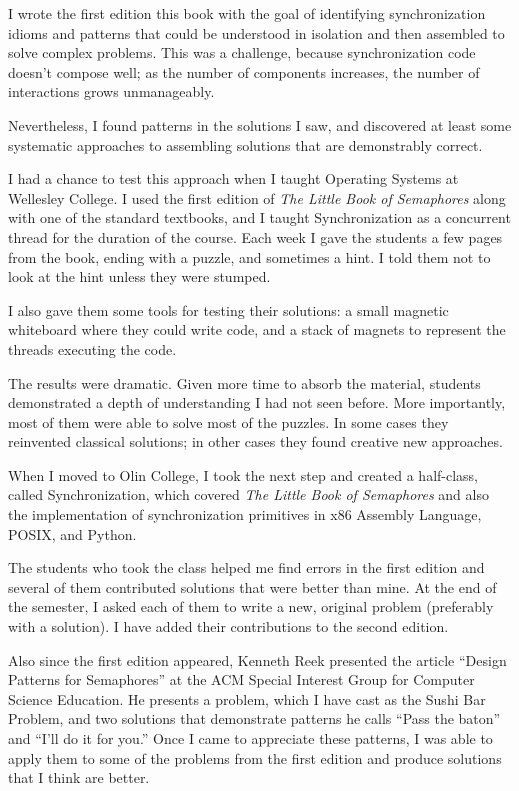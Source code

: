 \documentclass{book}
\begin{document}
I wrote the first edition this book with the goal of identifying
synchronization idioms and patterns that could be 
understood in isolation and then assembled to solve complex problems.
This was a challenge, because synchronization code doesn't compose
well; as the number of components increases, the number of interactions
grows unmanageably.

Nevertheless, I found patterns in the solutions I saw, and discovered
at least some systematic approaches to assembling solutions that are
demonstrably correct.

I had a chance to test this approach when I taught Operating Systems
at Wellesley College.  I used the first edition of {\em The Little
Book of Semaphores} along with one of the standard textbooks, and I
taught Synchronization as a concurrent thread for the duration of the
course.  Each week I gave the students a few pages from the book,
ending with a puzzle, and sometimes a hint.  I told them not to look
at the hint unless they were stumped.

I also gave them some tools for testing their solutions: a small
magnetic whiteboard where they could write code, and a stack of
magnets to represent the threads executing the code.

The results were dramatic.  Given more time to absorb the material,
students demonstrated a depth of understanding I had not seen before.
More importantly, most of them were able to solve most of the puzzles.
In some cases they reinvented classical solutions; in other cases
they found creative new approaches.

When I moved to Olin College, I took the next step and created a
half-class, called Synchronization, which covered
{\em The Little Book of Semaphores} and also the implementation of
synchronization primitives in x86 Assembly Language, POSIX, and
Python.

The students who took the class
helped me find errors in the first edition and several
of them contributed solutions that were better than mine.  At the
end of the semester, I asked each of them to write a new,
original problem (preferably with a solution).  I have added their
contributions to the second edition.

Also since the first edition appeared, Kenneth Reek presented the
article ``Design Patterns for Semaphores'' at the ACM Special Interest
Group for Computer Science Education.  He presents a problem, which
I have cast as the Sushi Bar Problem, and two solutions that demonstrate
patterns he calls ``Pass the baton'' and ``I'll do it for you.''
Once I came to appreciate these patterns, I was able to apply them
to some of the problems from the first edition and produce solutions
that I think are better.
\end{document}
